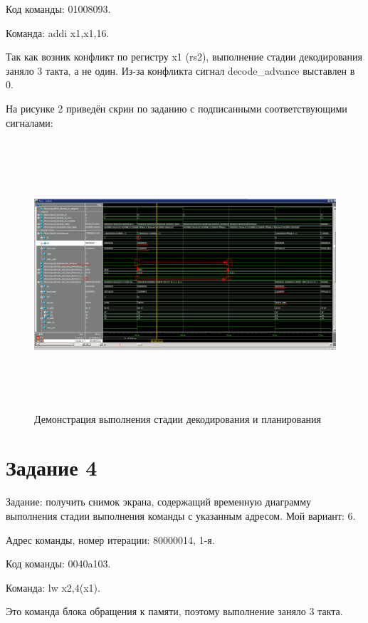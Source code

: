 Код команды: 01008093.

Команда: addi x1,x1,16.

Так как возник конфликт по регистру x1 (rs2), выполнение стадии декодирования заняло 3 такта, а не один.
Из-за конфликта сигнал decode\_advance выставлен в 0.

На рисунке 2 приведён скрин по заданию с подписанными соответствующими сигналами:
\FloatBarrier
\begin{figure}[h]
	\begin{center}
		\includegraphics[width=\linewidth, height=10cm]{inc/second_ex.png}
	\end{center}
	\caption{Демонстрация выполнения стадии декодирования и планирования}
\end{figure}
\FloatBarrier

\section*{Задание 4}

Задание: получить снимок экрана, содержащий временную диаграмму выполнения стадии выполнения команды с указанным адресом.
Мой вариант: 6.

Адрес команды, номер итерации: 80000014, 1-я.

Код команды: 0040a103. 

Команда: lw x2,4(x1).

Это команда блока обращения к памяти, поэтому выполнение заняло 3 такта.

